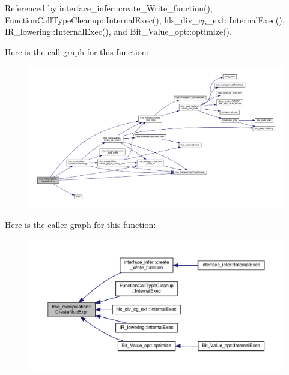 Referenced by interface\+\_\+infer\+::create\+\_\+\+Write\+\_\+function(), Function\+Call\+Type\+Cleanup\+::\+Internal\+Exec(), hls\+\_\+div\+\_\+cg\+\_\+ext\+::\+Internal\+Exec(), I\+R\+\_\+lowering\+::\+Internal\+Exec(), and Bit\+\_\+\+Value\+\_\+opt\+::optimize().

Here is the call graph for this function\+:
\nopagebreak
\begin{figure}[H]
\begin{center}
\leavevmode
\includegraphics[width=350pt]{d0/d99/classtree__manipulation_a115aa311fc7b9f2709dbebd0ac7087f8_cgraph}
\end{center}
\end{figure}
Here is the caller graph for this function\+:
\nopagebreak
\begin{figure}[H]
\begin{center}
\leavevmode
\includegraphics[width=350pt]{d0/d99/classtree__manipulation_a115aa311fc7b9f2709dbebd0ac7087f8_icgraph}
\end{center}
\end{figure}
\mbox{\label{classtree__manipulation_a6bdfc591cd81c654827164247d9e7b08}} 
